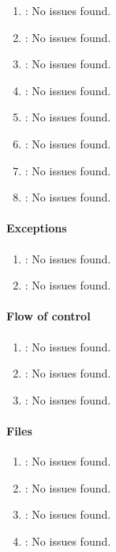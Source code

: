 \begin{enumerate} [resume]
	\item \emph{\checkAR}: No issues found.
	\item \emph{\checkAS}: No issues found.
	\item \emph{\checkAT}: No issues found.
	\item \emph{\checkAU}: No issues found.
	\item \emph{\checkAV}: No issues found.
	\item \emph{\checkAW}: No issues found.
	\item \emph{\checkAX}: No issues found.
	\item \emph{\checkAY}: No issues found.
\end{enumerate}

\paragraph{Exceptions} %
\label{par:exceptions}

\begin{enumerate} [resume]
	\item \emph{\checkAZ}: No issues found.
	\item \emph{\checkBA}: No issues found.
\end{enumerate}

\paragraph{Flow of control} %
\label{par:flow_of_control}

\begin{enumerate} [resume]
	\item \emph{\checkBB}: No issues found.
	\item \emph{\checkBC}: No issues found.
	\item \emph{\checkBD}: No issues found.
\end{enumerate}

\paragraph{Files} %
\label{par:files}

\begin{enumerate} [resume]
	\item \emph{\checkBE}: No issues found.
	\item \emph{\checkBF}: No issues found.
	\item \emph{\checkBG}: No issues found.
	\item \emph{\checkBH}: No issues found.
\end{enumerate}
